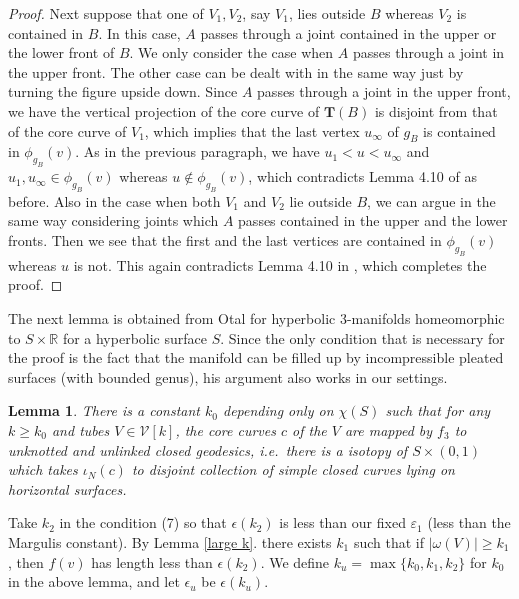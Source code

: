 \documentclass{amsart}
\newtheorem{lemma}[theorem]{Lemma}
\theoremstyle{definition}
\numberwithin{figure}{section}
\numberwithin{equation}{section}
\newcommand{\blackboard}[1]{\ensuremath{\mathbb{#1}}}
\newcommand{\reals}{\blackboard{R}}
\newcommand{\ie}{i.e.\ }
\def\ck{\mathcal{K}}
\def\cu{\mathcal{U}}
\def\cv{\mathcal{V}}
\begin{document}
\begin{proof}
 Next suppose that one of $V_1, V_2$, say $V_1$, lies outside $B$ whereas $V_2$ is contained in $B$.
 In this case, $A$ passes through a joint contained in the upper or the lower front of $B$.
 We only consider the case when $A$ passes through a joint in the upper front.
 The other case can be dealt with in the same way just by turning the figure upside down.
 Since $A$ passes through a joint in the upper front, we have the vertical projection of the core curve of $\boldsymbol{T}(B)$ is disjoint from that of the core curve of $V_1$, which implies that the last vertex $u_\infty$ of $g_B$  is contained in $\phi_{g_B}(v)$.
As in the previous paragraph, we have $u_1 < u < u_\infty$ and $u_1, u_\infty \in \phi_{g_B}(v)$ whereas $u \not\in \phi_{g_B}(v)$, which contradicts Lemma 4.10 of \cite{mm2} as before.
Also in the case when both $V_1$ and $V_2$ lie outside $B$, we can argue in the same way considering joints which $A$ passes contained in the upper and the lower fronts.
Then we see that the first and the last vertices are contained in $\phi_{g_B}(v)$ whereas $u$ is not.
This again contradicts Lemma 4.10 in \cite{mm2}, which completes the proof.
\end{proof}

The next lemma is obtained from Otal \cite{otal} for  hyperbolic 3-manifolds  homeomorphic to $S \times \reals$ for a hyperbolic surface $S$.
Since the only condition that is necessary for the proof is the fact that the manifold can be filled up by incompressible pleated surfaces (with bounded genus), his argument also works in our settings.
\begin{lemma}
\label{Otal}
There is a constant $k_0$ depending only on $\chi(S)$ such that for any $k \geq k_0$ and tubes $V \in \cv[k]$, the core curves $c$ of the $V$ are mapped by $f_3$ to   unknotted and unlinked closed geodesics, \ie there is a isotopy of $S \times(0,1)$ which takes $\iota_N(c)$ to disjoint collection of simple closed curves lying on horizontal surfaces.
\end{lemma}

Take $k_2$ in the condition (7) so that $\epsilon(k_2)$ is less than our fixed $\varepsilon_1$ (less than the Margulis constant).
By Lemma \ref{large k}. there exists $k_1$ such that if $|\omega(V)| \geq k_1$, then $f(v)$ has length less than $\epsilon(k_2)$.
We define $k_u = \max\{k_0, k_1, k_2\}$ for $k_0$ in the above lemma, and let $\epsilon_u$ be $\epsilon(k_u)$.
\end{document}
